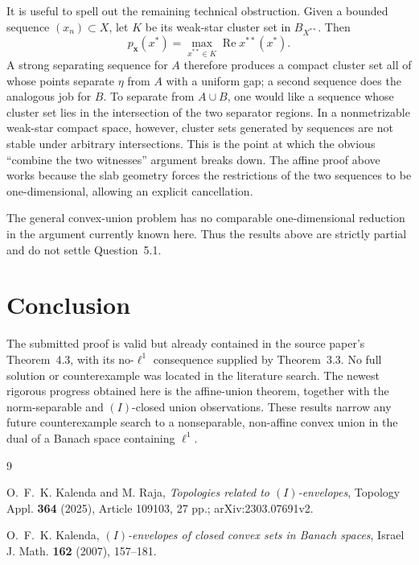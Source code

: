 \documentclass[11pt]{article}
\theoremstyle{remark}
\newcommand{\Ree}{\operatorname{Re}}
\begin{document}
It is useful to spell out the remaining technical obstruction.  Given a
bounded sequence $(x_n)\subset X$, let $K$ be its weak-star cluster set in
$B_{X^{**}}$.  Then
\[
 p_{\mathbf{x}}(x^*)
 =\max_{x^{**}\in K}\Ree x^{**}(x^*).
\]
A strong separating sequence for $A$ therefore produces a compact cluster
set all of whose points separate $\eta$ from $A$ with a uniform gap; a
second sequence does the analogous job for $B$.  To separate from
$A\cup B$, one would like a sequence whose cluster set lies in the
intersection of the two separator regions.  In a nonmetrizable weak-star
compact space, however, cluster sets generated by sequences are not stable
under arbitrary intersections.  This is the point at which the obvious
``combine the two witnesses'' argument breaks down.  The affine proof above
works because the slab geometry forces the restrictions of the two
sequences to be one-dimensional, allowing an explicit cancellation.

The general convex-union problem has no comparable one-dimensional
reduction in the argument currently known here.  Thus the results above are
strictly partial and do not settle Question~5.1.

\section{Conclusion}

The submitted proof is valid but already contained in the source paper's
Theorem~4.3, with its no-$\ell^1$ consequence supplied by Theorem~3.3.  No
full solution or counterexample was located in the literature search.  The
newest rigorous progress obtained here is the affine-union theorem,
together with the norm-separable and $(I)$-closed union observations.  These results narrow any
future counterexample search to a nonseparable, non-affine convex union in
the dual of a Banach space containing $\ell^1$.

\begin{thebibliography}{9}

O.~F.~K. Kalenda and M. Raja,
\emph{Topologies related to $(I)$-envelopes},
Topology Appl. \textbf{364} (2025), Article 109103, 27 pp.;
arXiv:2303.07691v2.

O.~F.~K. Kalenda,
\emph{$(I)$-envelopes of closed convex sets in Banach spaces},
Israel J. Math. \textbf{162} (2007), 157--181.

\end{thebibliography}
\end{document}
